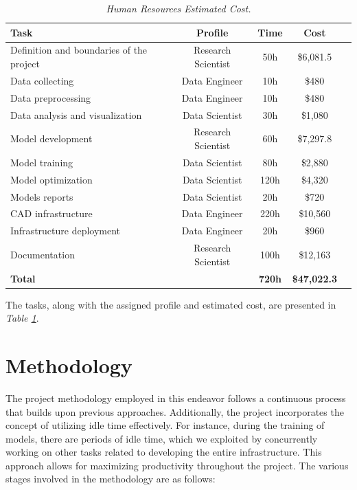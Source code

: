 \newpage

\begin{table}[H]
\centering
\begin{tabular}{lcccc}
	 \toprule
\textbf{Task} & \textbf{Profile} & \textbf{Time} & \textbf{Cost} \\
		\midrule
    Definition and boundaries of the project & Research Scientist & 50h & \$6,081.5\\
    Data collecting & Data Engineer & 10h & \$480\\
    Data preprocessing & Data Engineer & 10h & \$480 \\
    Data analysis and visualization & Data Scientist & 30h & \$1,080\\
    Model development & Research Scientist & 60h & \$7,297.8 \\
    Model training & Data Scientist & 80h & \$2,880 \\
    Model optimization & Data Scientist & 120h & \$4,320 \\
    Models reports & Data Scientist & 20h & \$720 \\
    CAD infrastructure & Data Engineer & 220h & \$10,560 \\
    Infrastructure deployment & Data Engineer & 20h & \$960 \\
    Documentation & Research Scientist & 100h & \$12,163 \\
		\midrule
    \textbf{Total} &    &  \textbf{720h} & \textbf{\$47,022.3} \\
    \bottomrule
\end{tabular}
\caption[Human Resources Estimated Cost.]{\textit{Human Resources Estimated Cost.}}
{\label{table:human_resources_cost}}
\end{table}

The tasks, along with the assigned profile and estimated cost, are presented in \textit{Table \ref{table:human_resources_cost}}. \\

\section{Methodology}

The project methodology employed in this endeavor
follows a continuous process that builds upon previous approaches.
Additionally, the project incorporates the concept of utilizing idle time effectively.
For instance, during the training of models, there are periods of idle time, which we exploited by
concurrently working on other tasks related to developing the entire infrastructure.
This approach allows for maximizing productivity throughout the project.
The various stages involved in the methodology are as follows: \\

